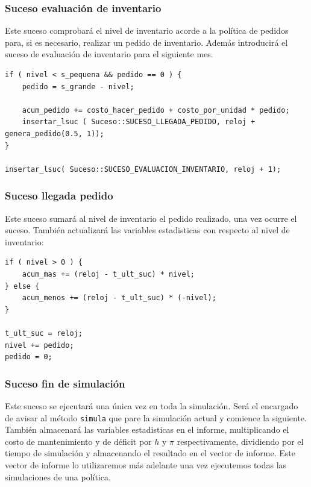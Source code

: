 \documentclass[12pt, spanish]{article}
\begin{document}
\subsubsection{Suceso evaluación de inventario}

Este suceso comprobará el nivel de inventario acorde a la política de pedidos para, si es necesario, realizar un pedido de inventario. Además introducirá el suceso de evaluación de inventario para el siguiente mes.

\begin{lstlisting}
if ( nivel < s_pequena && pedido == 0 ) {
	pedido = s_grande - nivel;

	acum_pedido += costo_hacer_pedido + costo_por_unidad * pedido;
	insertar_lsuc ( Suceso::SUCESO_LLEGADA_PEDIDO, reloj + genera_pedido(0.5, 1));
}

insertar_lsuc( Suceso::SUCESO_EVALUACION_INVENTARIO, reloj + 1);
\end{lstlisting}

\subsubsection{Suceso llegada pedido}

Este suceso sumará al nivel de inventario el pedido realizado, una vez ocurre el suceso. También actualizará las variables estadisticas con respecto al nivel de inventario:

\begin{lstlisting}
if ( nivel > 0 ) {
	acum_mas += (reloj - t_ult_suc) * nivel;
} else {
	acum_menos += (reloj - t_ult_suc) * (-nivel);
}

t_ult_suc = reloj;
nivel += pedido;
pedido = 0;
\end{lstlisting}

\subsubsection{Suceso fin de simulación}

Este suceso se ejecutará una única vez en toda la simulación. Será el encargado de avisar al método \texttt{simula} que pare la simulación actual y comience la siguiente. También almacenará las variables estadisticas en el informe, multiplicando el costo de mantenimiento y de déficit por $h$ y $\pi$ respectivamente, dividiendo por el tiempo de simulación y almacenando el resultado en el vector de informe. Este vector de informe lo utilizaremos más adelante una vez ejecutemos todas las simulaciones de una política.
\end{document}

